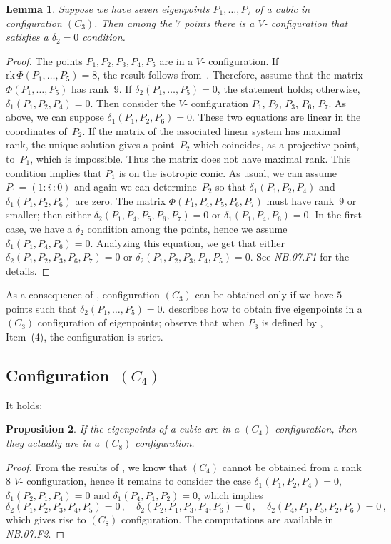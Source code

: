 \documentclass[a4paper, 11pt, reqno]{amsart}
\theoremstyle{plain}
\newtheorem{lemma}{Lemma}[section]
\newtheorem{prop}[lemma]{Proposition}
\theoremstyle{definition}
\newcommand{\nb}[2]{\textsl{{NB}.{#1}.{#2}}}
\newcommand{\iii}{\textit{i}\,}
\newcommand{\rk}{\ensuremath{\mathrm{rk}}}
\begin{document}
\begin{lemma}
\label{lemma:no_delta1_delta1}
Suppose we have seven eigenpoints $P_1, \dots, P_7$
of a cubic in configuration $(C_3)$. Then among the $7$ points there is a
$V$- configuration that satisfies a $\delta_2 = 0$ condition.
\end{lemma}
\begin{proof}
The points $P_1, P_2, P_3, P_4, P_5$ are in a $V$- configuration.
If $\rk \, \Phi(P_1, \dots, P_5) = 8$, the result follows from~.
Therefore, assume that the matrix $\Phi(P_1, \dots, P_5)$ has rank~$9$.
If $\delta_2(P_1, \dots, P_5) = 0$, the statement holds;
otherwise, $\delta_1(P_1, P_2, P_4) = 0$.
Then consider the $V$- configuration $P_1$, $P_2$, $P_3$, $P_6$, $P_7$.
As above, we can suppose $\delta_1(P_1, P_2, P_6) = 0$.
These two equations are
linear in the coordinates of~$P_2$.
If the matrix of the associated linear system has
maximal rank, the unique solution gives a point~$P_2$ which coincides, as a projective point, to~$P_1$, which is impossible.
Thus the matrix does not have maximal rank.
This condition implies that $P_1$ is on the
isotropic conic. As usual, we can assume
$P_1 = (1: \iii: 0)$ and again
we can determine~$P_2$ so that $\delta_1(P_1, P_2, P_4)$ and
$\delta_1(P_1, P_2, P_6)$ are zero. The matrix $\Phi(P_1, P_4, P_5, P_6, P_7)$
must have rank~$9$ or smaller; then either
$\delta_2(P_1, P_4, P_5, P_6, P_7)=0$ or $\delta_1(P_1, P_4, P_6) = 0$. In
the first case, we have a $\delta_2$ condition among the points, hence
we assume $\delta_1(P_1, P_4, P_6) = 0$. Analyzing this equation, we get that either
$\delta_2(P_1, P_2, P_3, P_6, P_7) = 0$ or
$\delta_2(P_1, P_2, P_3, P_4, P_5) = 0$.
See  \nb{07}{F1} for the details.
\end{proof}

As a consequence of , configuration $(C_3)$ can
be obtained only if we have $5$ points such that
$\delta_2(P_1, \dotsc, P_5) = 0$.  describes how to
obtain five eigenpoints in a $(C_3)$ configuration of eigenpoints; observe that when $P_3$ is defined by , Item~(4), the configuration is strict.

\subsection*{Configuration~\texorpdfstring{$(C_4)$}{C4}}
It holds:
\begin{prop}
If the eigenpoints of a cubic are in a $(C_4)$ configuration, then they actually are in a $(C_8)$ configuration.
\end{prop}
\begin{proof}
From the results of , we know that $(C_4)$
cannot be obtained from a rank $8$ $V$- configuration,
hence it remains to consider the case $\delta_1(P_1, P_2, P_4) = 0$,
$\delta_1(P_2, P_1, P_4) = 0$ and $\delta_1(P_4, P_1, P_2) = 0$,
which implies
%
\[
  \delta_2(P_1, P_2, P_3, P_4, P_5) = 0 \,, \quad
  \delta_2(P_2, P_1, P_3, P_4, P_6) = 0 \,, \quad
  \delta_2(P_4, P_1, P_5, P_2, P_6) = 0 \,,
\]
%
which gives rise to $(C_8)$ configuration. The computations are available in \nb{07}{F2}.
\end{proof}
\end{document}
